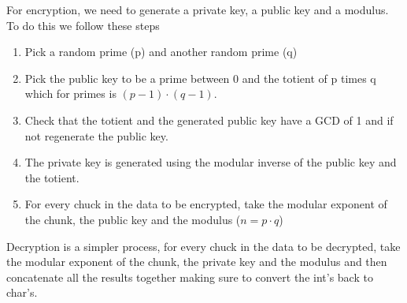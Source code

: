 \documentclass[journal,a4paper]{article}
\begin{document}
For encryption, we need to generate a private key, a public key and a modulus. To do this we follow these steps
\begin{enumerate}
	\itemsep0em
	\item Pick a random prime (p) and another random prime (q)
	\item Pick the public key to be a prime between 0 and the totient of p times q which for primes is $(p-1)\cdot (q-1)$.
	\item Check that the totient and the generated public key have a GCD of 1 and if not regenerate the public key.
	\item The private key is generated using the modular inverse of the public key and the totient.
	\item For every chuck in the data to be encrypted, take the modular exponent of the chunk, the public key and the modulus ($n = p\cdot q$)
\end{enumerate}

Decryption is a simpler process, for every chuck in the data to be decrypted, take the modular exponent of the chunk, the private key and the modulus and then concatenate all the results together making sure to convert the int's back to char's.
\end{document}
